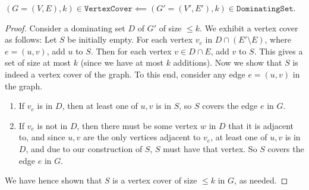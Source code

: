 \begin{soln}
    \begin{claim}
        $(G = (V, E), k) \in \texttt{VertexCover} \impliedby (G' = (V', E'), k) \in \texttt{DominatingSet}$.
    \end{claim}
    \begin{proof}
        Consider a dominating set $D$ of $G'$ of size $\le k$. We exhibit a vertex cover as follows:
        Let $S$ be initially empty. For each vertex $v_e$ in $D \cap (E' \setminus E)$, where $e = (u, v)$, add $u$ to $S$. Then for each vertex $v \in D \cap E$, add $v$ to $S$. This gives a set of
        size at most $k$ (since we have at most $k$ additions).\nl
        Now we show that $S$ is indeed a vertex cover of the graph. To this end, consider any edge $e = (u, v)$ in the graph.
        \begin{enumerate}
            \item If $v_e$ is in $D$, then at least one of $u, v$ is in $S$, so $S$ covers the edge $e$ in $G$.
            \item If $v_e$ is not in $D$, then there must be some vertex $w$ in $D$ that it is adjacent to, and since $u, v$ are the only vertices adjacent to $v_e$, at least one of $u, v$ is in
                $D$, and due to our construction of $S$, $S$ must have that vertex. So $S$ covers the edge $e$ in $G$.
        \end{enumerate}
        We have hence shown that $S$ is a vertex cover of size $\le k$ in $G$, as needed.
    \end{proof}
\end{soln}
